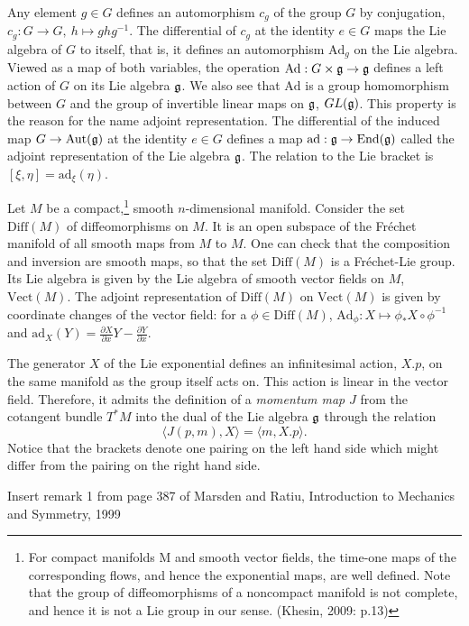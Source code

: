 \documentclass{article}
\theoremstyle{plain}
\theoremstyle{definition}
\newcommand{\Diff}{\ensuremath{\mathrm{Diff}}}
\newcommand{\Vect}{\ensuremath{\mathrm{Vect}}}
\newcommand{\Ad}{\ensuremath{\mathrm{Ad}}}
\newcommand{\ad}{\ensuremath{\mathrm{ad}}}
\newcommand{\mf}{\ensuremath{\mathfrak}}
\begin{document}
Any element $g\in G$ defines an automorphism $c_g$ of the group $G$ by conjugation, $c_g:G\to G,\ h\mapsto ghg^{-1}$. The differential of $c_g$ at the identity $e\in G$ maps the Lie algebra of $G$ to itself, that is, it defines an automorphism $\Ad_g$ on the Lie algebra. Viewed as a map of both variables, the operation $\Ad:G\times \mf g\to \mf g$ defines a left action of $G$ on its Lie algebra $\mf g$. We also see that $\Ad$ is a group homomorphism between $G$ and the group of invertible linear maps on $\mf g$, $GL(\mf g)$. This property is the reason for the name adjoint representation. The differential of the induced map $G\to\mathrm{Aut}(\mf g)$ at the identity $e\in G$ defines a map $\ad : \mf g\to \mathrm{End}(\mf g)$ called the adjoint representation of the Lie algebra $\mf g$. The relation to the Lie bracket is $[\xi,\eta]=\ad_\xi(\eta)$.

Let $M$ be a compact,\footnote{For compact manifolds M and smooth vector fields, the time-one maps of the corresponding flows, and hence the exponential maps, are well defined. Note that the group of diffeomorphisms of a noncompact manifold is not complete, and hence it is not a Lie group in our sense. (Khesin, 2009: p.13)} 
smooth $n$-dimensional manifold. Consider the
set $\Diff(M)$ of diffeomorphisms on $M$. It is an open subspace of the Fréchet
manifold of all smooth maps from $M$ to $M$. One can check that the composition
and inversion are smooth maps, so that the set $\Diff(M)$ is a Fréchet-Lie group. Its Lie algebra is given by the Lie algebra of smooth vector fields on $M$, $\Vect(M)$. The adjoint representation of $\Diff(M)$ on $\Vect(M)$ is given by coordinate changes of the vector field: for a $\phi\in\Diff(M)$, $\Ad_\phi:X\mapsto \phi_*X\circ \phi^{-1}$ and $\ad_X(Y)=\frac{\partial X}{\partial x}Y-\frac{\partial Y}{\partial x}$.

The generator $X$ of the Lie exponential defines an infinitesimal action, $X.p$, on the same manifold as the group itself acts on. This action is linear in the vector field. Therefore, it admits the definition of a \textit{momentum map} $J$ from the cotangent bundle $T^*M$ into the dual of the Lie algebra $\mf g$ through the relation
\[
\langle J(p,m),X\rangle = \langle m,X.p\rangle.
\]
Notice that the brackets denote one pairing on the left hand side which might differ from the pairing on the right hand side.

Insert remark 1 from page 387 of Marsden and Ratiu, Introduction to Mechanics and Symmetry, 1999
\end{document}
